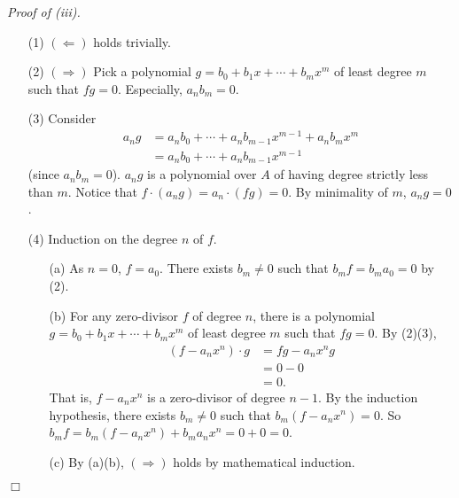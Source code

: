\documentclass{article}
\begin{document}
\emph{Proof of (iii).}
\begin{enumerate}
\item[(1)]
  $(\Longleftarrow)$ holds trivially.

\item[(2)]
  $(\Longrightarrow)$
  Pick a polynomial $g = b_0 + b_1 x + \cdots + b_m x^m$
  of least degree $m$ such that $fg = 0$.
  Especially, $a_n b_m = 0$.

\item[(3)]
  Consider
  \begin{align*}
    a_n g
    &= a_n b_0 + \cdots + a_n b_{m-1} x^{m-1} + a_n b_m x^m \\
    &= a_n b_0 + \cdots + a_n b_{m-1} x^{m-1}
  \end{align*}
  (since $a_n b_m = 0$).
  $a_n g$ is a polynomial over $A$ of having degree strictly less than $m$.
  Notice that $f \cdot (a_n g) = a_n \cdot (fg)= 0$.
  By minimality of $m$, $a_n g = 0$.

\item[(4)]
  Induction on the degree $n$ of $f$.
  \begin{enumerate}
  \item[(a)]
    As $n = 0$, $f = a_0$. There exists $b_m \neq 0$ such that $b_m f = b_m a_0 = 0$ by (2).
  
  \item[(b)]
    For any zero-divisor $f$ of degree $n$,
    there is a polynomial $g = b_0 + b_1 x + \cdots + b_m x^m$
    of least degree $m$ such that $fg = 0$. By (2)(3),
    \begin{align*}
      (f - a_n x^n) \cdot g
      &= fg - a_n x^n g \\
      &= 0 - 0 \\
      &= 0.
    \end{align*}
    That is, $f - a_n x^n$ is a zero-divisor of degree $n-1$.
    By the induction hypothesis,
    there exists $b_m \neq 0$ such that $b_{m}(f - a_n x^n) = 0$.
    So $b_m f = b_{m}(f - a_n x^n) + b_m a_n x^n = 0 + 0 = 0$.

    \item[(c)]
      By (a)(b), $(\Longrightarrow)$ holds by mathematical induction.
  \end{enumerate}
\end{enumerate}
$\Box$ \\
\end{document}
